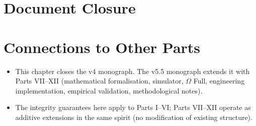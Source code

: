 \section{Document Closure}
\label{sec:final-closure}


\section*{Connections to Other Parts}

\begin{itemize}
\item This chapter closes the v4 monograph. The v5.5 monograph
extends it with Parts VII--XII (mathematical formalisation,
simulator, $\Omega$ Full, engineering implementation, empirical
validation, methodological notes).
\item The integrity guarantees here apply to Parts I--VI; Parts
VII--XII operate as additive extensions in the same spirit
(no modification of existing structure).
\end{itemize}
